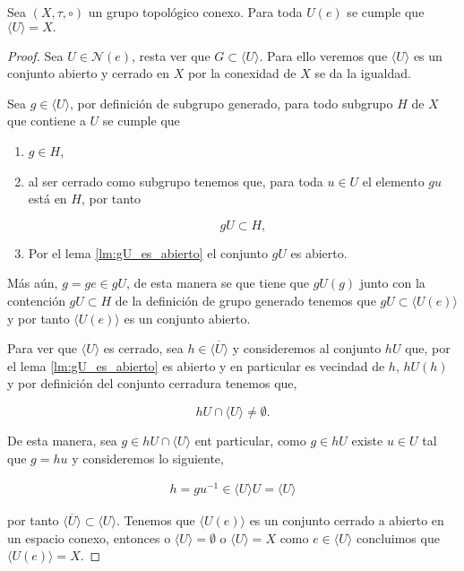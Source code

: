 \begin{pr} \label{pr:vec_de_la_id_gen}
Sea $(X, \tau, \circ)$ un grupo topológico conexo. Para toda $U(e)$ se cumple que $\langle U\rangle=X.$
\end{pr}
	
\begin{proof}
Sea $U \in \mathcal{N}(e)$, resta ver que $G \subset \langle U \rangle$. Para ello veremos que $\langle U \rangle$ es un conjunto abierto y cerrado en $X$ por la conexidad de $X$ se da la igualdad.

 Sea $g \in \langle U \rangle$, por definición de subgrupo generado, para todo subgrupo $H$ de $X$ que contiene a $U$ se cumple  que 
\begin{enumerate}
	\item $g \in H$,
	\item al ser cerrado como subgrupo tenemos que, para toda $u \in U$ el elemento $gu$ está en $H$, por tanto
 
 $$gU \subset H,$$
 
 \item Por el lema \ref{lm:gU_es_abierto} el conjunto $gU$ es abierto.
\end{enumerate} 
 
 
Más aún, $g=ge \in gU$, de esta manera se que tiene que  $gU(g)$ junto con la contención $gU \subset H$ de la definición de grupo generado tenemos que  $gU \subset \langle U(e) \rangle$ y por tanto $\langle U(e) \rangle$ es un conjunto abierto.

Para ver que $\langle U \rangle$ es cerrado, sea $h \in \overline{\langle U \rangle}$ y consideremos al conjunto $hU$ que, por el lema \ref{lm:gU_es_abierto} es abierto y en particular es vecindad de $h$, $hU(h)$ y por definición del conjunto cerradura tenemos que, 

$$hU \cap \langle U \rangle \neq \emptyset.$$

 De esta manera, sea $g \in hU\cap \langle U \rangle$ ent particular, como $g \in hU$ existe $u \in U$ tal que $g=hu$ y consideremos lo siguiente, 

\begin{align*}
h=gu^{-1} \in  \langle U \rangle U =\langle U \rangle
\end{align*} 
 
 por tanto $\overline{\langle U \rangle} \subset \langle U \rangle.$ Tenemos que $\langle U(e) \rangle$ es un conjunto cerrado a abierto en un espacio conexo, entonces o $\langle U \rangle=\emptyset$ o $\langle U \rangle=X$ como $e \in \langle U \rangle$ concluimos que $\langle U(e) \rangle = X.$
\end{proof}




